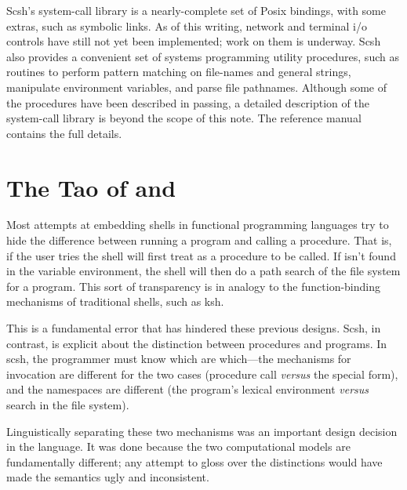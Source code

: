 Scsh's system-call library is a nearly-complete set of {\sc Posix} bindings,
with some extras, such as symbolic links.
As of this writing, network and terminal i/o controls have still not yet
been implemented; work on them is underway.
Scsh also provides a convenient set of systems programming utility procedures,
such as routines to perform pattern matching on file-names and general strings,
manipulate {\Unix} environment variables, and parse file pathnames.
Although some of the procedures have been described in passing,
a detailed description of the system-call library is beyond the scope of
this note. 
The reference manual \cite{ref-man} contains the full details.

\section{The Tao of {\Scheme} and {\Unix}}
\label{sec:zen}
Most attempts at embedding shells in functional programming languages
\cite{fsh,ellis}
try to hide the difference between running a program and calling a procedure.
That is, if the user tries
the shell will first treat  as a procedure to be called.
If  isn't found in the variable environment, the shell will then
do a path search of the file system for a program.
This sort of transparency is in analogy to the function-binding mechanisms
of traditional shells, such as ksh.

This is a fundamental error that has hindered these previous designs.
Scsh, in contrast, is explicit about the distinction between 
procedures and programs.
In scsh, the programmer must know which are which---the mechanisms
for invocation are different for the two cases 
  (procedure call {\em versus\/} the  special form),
and the namespaces are different 
  (the program's lexical environment {\em versus\/}
    search in the file system).

Linguistically separating these two mechanisms was an important design
decision in the language.
It was done because the two computational models are fundamentally different;
any attempt to gloss over the distinctions would have made the semantics
ugly and inconsistent.

